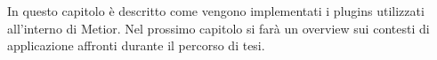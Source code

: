 In questo capitolo \`e descritto come vengono implementati i plugins utilizzati all'interno di Metior.
Nel prossimo capitolo si farà un overview sui contesti di applicazione affronti durante il percorso di tesi.
